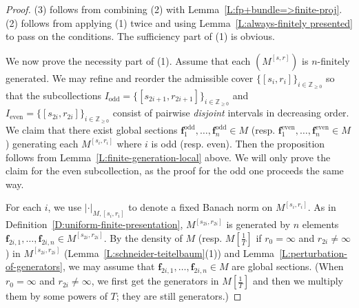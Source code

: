 \documentclass[12pt]{article}
\theoremstyle{definition}
\numberwithin{equation}{theorem}
\newcommand{\ZZ}{\mathbb{Z}}
\newcommand{\bbf}{\mathbf{f}}
\newcommand{\even}{\mathrm{even}}
\newcommand{\odd}{\mathrm{odd}}
\begin{document}
\begin{proof}
(3) follows from combining (2) with Lemma~\ref{L:fp+bundle=>finite-proj}.  (2) follows from applying (1) twice and using Lemma~\ref{L:always-finitely presented} to pass on the conditions.
The sufficiency part of (1) is obvious.

We now prove the necessity part of (1).  Assume that each $(M^{[s,r]})$ is $n$-finitely generated.  We may refine and reorder the admissible cover $\{[s_i, r_i]\}_{i \in \ZZ_{\geq0}}$ so that the subcollections $I_\mathrm{odd} = \{[s_{2i+1}, r_{2i+1}]\}_{i \in \ZZ_{\geq0}}$ and $I_\mathrm{even} = \{[s_{2i}, r_{2i}]\}_{i \in \ZZ_{\geq0}}$ consist of pairwise \emph{disjoint} intervals in decreasing order.  We claim that there exist global sections $\bbf^\odd_1, \dots, \bbf^\odd_n \in M$ (resp. $\bbf^\even_1, \dots, \bbf^\even_n \in M$) generating each $M^{[s_i, r_i]}$ where $i$ is odd (resp. even).  Then the proposition follows from Lemma~\ref{L:finite-generation-local} above. We will only prove the claim for the even subcollection, as the proof for the odd one proceeds the same way.

For each $i$, we use $|\cdot|_{M, [s_i, r_i]}$ to denote a fixed Banach norm on $M^{[s_i,r_i]}$.
As in Definition~\ref{D:uniform-finite-presentation}, $M^{[s_{2i}, r_{2i}]}$ is generated by $n$ elements $\bbf_{2i, 1}, \dots, \bbf_{2i,n} \in M^{[s_{2i}, r_{2i}]}$.  
By the density of 
$M$ (resp. $M[\frac 1T]$ if $r_0=\infty$ and $r_{2i}\neq \infty$) in $M^{[s_{2i}, r_{2i}]}$ (Lemma~\ref{L:schneider-teitelbaum}(1))
 and Lemma~\ref{L:perturbation-of-generators},
we may assume that $\bbf_{2i, 1}, \dots, \bbf_{2i,n} \in M$ are global sections.  (When $r_0=\infty$ and $r_{2i}\neq \infty$, we first get the generators in $M[\frac 1T]$ and then we multiply them by some powers of $T$; they are still generators.)


\end{proof}
\end{document}

